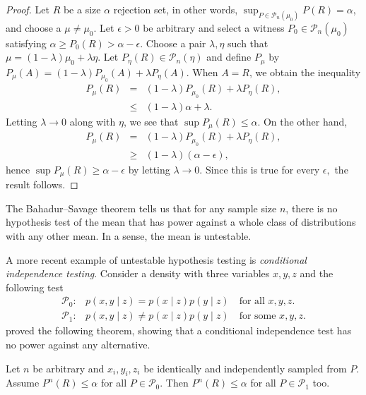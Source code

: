 \begin{proof}
Let $R$ be a size $\alpha$ rejection set, in other words, $\sup_{P\in\mathcal{P}_{n}(\mu_{0})}P(R)=\alpha$,
and choose a $\mu\neq\mu_{0}$. Let $\epsilon>0$ be arbitrary and
select a witness $P_{0}\in\mathcal{P}_{n}(\mu_{0})$ satisfying $\alpha\ge P_{0}(R)>\alpha-\epsilon$.
Choose a pair $\lambda,\eta$ such that $\mu=(1-\lambda)\mu_{0}+\lambda\eta$.
Let $P_{\eta}(R)\in\mathcal{P}_{n}(\eta)$ and define $P_{\mu}$ by
$P_{\mu}(A)=(1-\lambda)P_{\mu_{0}}(A)+\lambda P_{\eta}(A).$ When
$A=R$, we obtain the inequality
\begin{eqnarray*}
P_{\mu}(R) & = & (1-\lambda)P_{\mu_{0}}(R)+\lambda P_{\eta}(R),\\
 & \leq & (1-\lambda)\alpha+\lambda.
\end{eqnarray*}
Letting $\lambda\to0$ along with $\eta$, we see that $\sup P_{\mu}(R)\leq\alpha$.
On the other hand,
\begin{eqnarray*}
P_{\mu}(R) & = & (1-\lambda)P_{\mu_{0}}(R)+\lambda P_{\eta}(R),\\
 & \geq & (1-\lambda)(\alpha-\epsilon),
\end{eqnarray*}
hence $\sup P_{\mu}(R)\geq\alpha-\epsilon$ by letting $\lambda\to0$.
Since this is true for every $\epsilon,$ the result follows.
\end{proof}
The Bahadur--Savage theorem tells us that for any sample size $n$, there is no hypothesis test of the mean that has power against a whole class of distributions with any other mean. In a sense, the mean is untestable.

A more recent example of untestable hypothesis testing is \emph{conditional independence testing}. Consider a density with three variables $x,y,z$ and the following test
\begin{align*}
\mathcal{P}_{0}: & p(x,y\mid z)=p(x\mid z)p(y\mid z)\quad\textrm{for all }x,y,z.\\
\mathcal{P}_{1}: & p(x,y\mid z)\neq p(x\mid z)p(y\mid z)\quad\textrm{for some }x,y,z.
\end{align*}
\textcite{Shah2018-jh} proved the following theorem, showing that a
conditional independence test has no power against any alternative. 
\begin{theorem}
\label{theorem:Shah--Peters}Let $n$ be arbitrary and $x_{i},y_{i},z_{i}$ be identically and independently sampled from $P$. Assume $P^{n}(R)\leq\alpha$ for all $P\in\mathcal{P}_{0}$. Then $P^{n}(R)\leq\alpha$ for all $P\in\mathcal{P}_{1}$ too.
\end{theorem}

